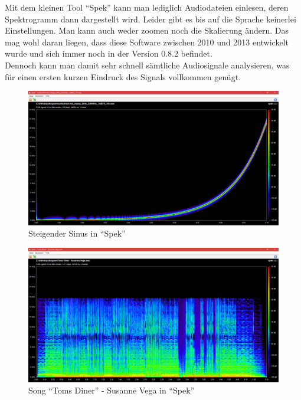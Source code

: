 \documentclass[a4paper]{article}
\begin{document}
Mit dem kleinen Tool "`Spek"' kann man lediglich Audiodateien einlesen, deren Spektrogramm dann dargestellt wird. Leider gibt es bis auf die Sprache keinerlei Einstellungen. Man kann auch weder zoomen noch die Skalierung ändern. Das mag wohl daran liegen, dass diese Software zwischen 2010 und 2013 entwickelt wurde und sich immer noch in der Version 0.8.2 befindet.\\
Dennoch kann man damit sehr schnell sämtliche Audiosignale analysieren, was für einen ersten kurzen Eindruck des Signals vollkommen genügt.\vspace{2em}
\begin{figure}[H]
    \centering
    \begin{minipage}{1.0\textwidth}
        \centering
        \includegraphics[width=1.0\textwidth]{Spek_Sine_Sweep.png}
        \caption{Steigender Sinus in "`Spek"'}
    \end{minipage}\hfill
\end{figure}
\begin{figure}[H]
    \centering
    \begin{minipage}{1.0\textwidth}
        \centering
        \includegraphics[width=1.0\textwidth]{Spek_Toms_Diner.png}
        \caption{Song "`Toms Diner"' - Susanne Vega in "`Spek"'}
    \end{minipage}
\end{figure}
\newpage
\end{document}
